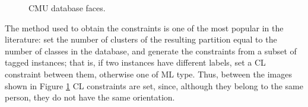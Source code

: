 \clearpage

\begin{figure}[bth]
	\myfloatalign
	 \quad
	 \quad
	 \quad
	\caption[CMU database faces.]{CMU database faces. \cite{davidson2007survey}}\label{fig:CMUFacesDatabase}
\end{figure}

The method used to obtain the constraints is one of the most popular in the literature: set the number of clusters of the resulting partition equal to the number of classes in the database, and generate the constraints from a subset of tagged instances; that is, if two instances have different labels, set a \acf{CL} constraint between them, otherwise one of \acf{ML} type. Thus, between the images shown in Figure \ref{fig:CMUFacesDatabase} \acf{CL} constraints are set, since, although they belong to the same person, they do not have the same orientation.


